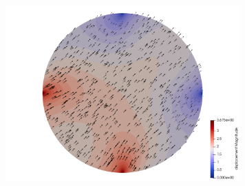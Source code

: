 \begin{center}
\includegraphics[width=9cm]{python_codes/fieldstone_58/experiment2/dispvect}
\end{center}






